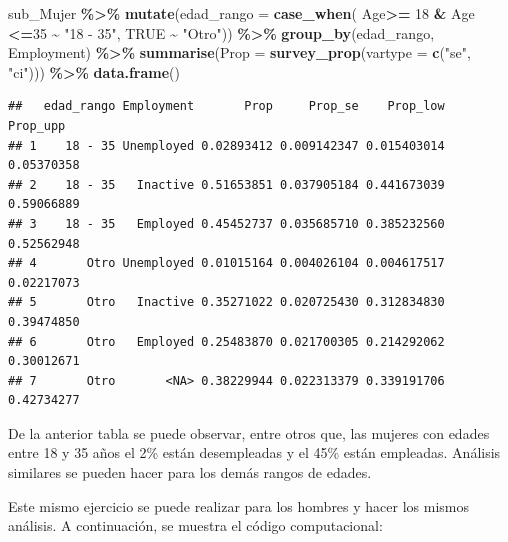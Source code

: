 \documentclass[
  12pt,
]{book}
\newenvironment{Shaded}{\begin{snugshade}}{\end{snugshade}}
\newcommand{\AttributeTok}[1]{\textcolor[rgb]{0.13,0.29,0.53}{#1}}
\newcommand{\ConstantTok}[1]{\textcolor[rgb]{0.56,0.35,0.01}{#1}}
\newcommand{\DecValTok}[1]{\textcolor[rgb]{0.00,0.00,0.81}{#1}}
\newcommand{\FunctionTok}[1]{\textcolor[rgb]{0.13,0.29,0.53}{\textbf{#1}}}
\newcommand{\NormalTok}[1]{#1}
\newcommand{\SpecialCharTok}[1]{\textcolor[rgb]{0.81,0.36,0.00}{\textbf{#1}}}
\newcommand{\StringTok}[1]{\textcolor[rgb]{0.31,0.60,0.02}{#1}}
\begin{document}
\begin{Shaded}
\begin{Highlighting}[]
\NormalTok{sub\_Mujer }\SpecialCharTok{\%\textgreater{}\%} \FunctionTok{mutate}\NormalTok{(}\AttributeTok{edad\_rango =} \FunctionTok{case\_when}\NormalTok{(}
\NormalTok{                     Age}\SpecialCharTok{\textgreater{}=} \DecValTok{18} \SpecialCharTok{\&}\NormalTok{ Age }\SpecialCharTok{\textless{}=}\DecValTok{35}  \SpecialCharTok{\textasciitilde{}} \StringTok{"18 {-} 35"}\NormalTok{, }\ConstantTok{TRUE} \SpecialCharTok{\textasciitilde{}} \StringTok{"Otro"}\NormalTok{)) }\SpecialCharTok{\%\textgreater{}\%}
                     \FunctionTok{group\_by}\NormalTok{(edad\_rango, Employment) }\SpecialCharTok{\%\textgreater{}\%} 
                     \FunctionTok{summarise}\NormalTok{(}\AttributeTok{Prop =} \FunctionTok{survey\_prop}\NormalTok{(}\AttributeTok{vartype =}  \FunctionTok{c}\NormalTok{(}\StringTok{"se"}\NormalTok{, }\StringTok{"ci"}\NormalTok{))) }\SpecialCharTok{\%\textgreater{}\%} 
                     \FunctionTok{data.frame}\NormalTok{()}
\end{Highlighting}
\end{Shaded}

\begin{verbatim}
##   edad_rango Employment       Prop     Prop_se    Prop_low   Prop_upp
## 1    18 - 35 Unemployed 0.02893412 0.009142347 0.015403014 0.05370358
## 2    18 - 35   Inactive 0.51653851 0.037905184 0.441673039 0.59066889
## 3    18 - 35   Employed 0.45452737 0.035685710 0.385232560 0.52562948
## 4       Otro Unemployed 0.01015164 0.004026104 0.004617517 0.02217073
## 5       Otro   Inactive 0.35271022 0.020725430 0.312834830 0.39474850
## 6       Otro   Employed 0.25483870 0.021700305 0.214292062 0.30012671
## 7       Otro       <NA> 0.38229944 0.022313379 0.339191706 0.42734277
\end{verbatim}

De la anterior tabla se puede observar, entre otros que, las mujeres con edades entre 18 y 35 años el 2\% están desempleadas y el 45\% están empleadas. Análisis similares se pueden hacer para los demás rangos de edades.

Este mismo ejercicio se puede realizar para los hombres y hacer los mismos análisis. A continuación, se muestra el código computacional:
\end{document}
